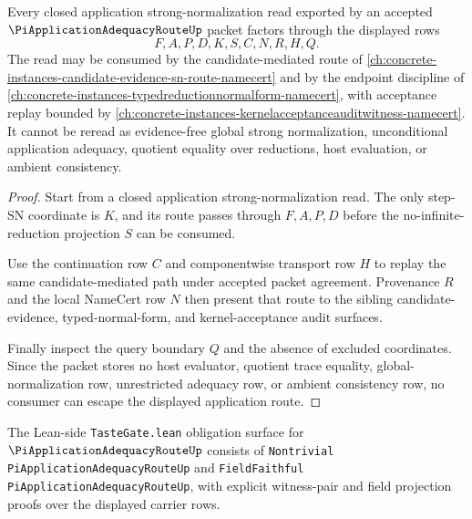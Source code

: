 \begin{theorem}
\label{thm:pi-application-adequacy-route-nonescape}
Every closed application strong-normalization read exported by an accepted $\PiApplicationAdequacyRouteUp$ packet factors through the displayed rows
$$
F,A,P,D,K,S,C,N,R,H,Q.
$$
The read may be consumed by the candidate-mediated route of \autoref{ch:concrete-instances-candidate-evidence-sn-route-namecert} and by the endpoint discipline of \autoref{ch:concrete-instances-typedreductionnormalform-namecert}, with acceptance replay bounded by \autoref{ch:concrete-instances-kernelacceptanceauditwitness-namecert}. It cannot be reread as evidence-free global strong normalization, unconditional application adequacy, quotient equality over reductions, host evaluation, or ambient consistency.
\end{theorem}
\begin{proof}
Start from a closed application strong-normalization read. The only step-SN coordinate is $K$, and its route passes through $F,A,P,D$ before the no-infinite-reduction projection $S$ can be consumed.

Use the continuation row $C$ and componentwise transport row $H$ to replay the same candidate-mediated path under accepted packet agreement. Provenance $R$ and the local NameCert row $N$ then present that route to the sibling candidate-evidence, typed-normal-form, and kernel-acceptance audit surfaces.

Finally inspect the query boundary $Q$ and the absence of excluded coordinates. Since the packet stores no host evaluator, quotient trace equality, global-normalization row, unrestricted adequacy row, or ambient consistency row, no consumer can escape the displayed application route.
\end{proof}



The Lean-side \texttt{TasteGate.lean} obligation surface for $\PiApplicationAdequacyRouteUp$ consists of \texttt{Nontrivial PiApplicationAdequacyRouteUp} and \texttt{FieldFaithful PiApplicationAdequacyRouteUp}, with explicit witness-pair and field projection proofs over the displayed carrier rows.

